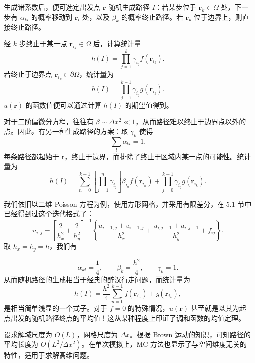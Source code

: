 生成诸系数后，便可选定出发点 $\bm r$ 随机生成路径 $I$：若某步位于 $\bm r_k\in\Omega$ 处，下一步有 $\alpha_{kl}$ 的概率移动到 $\bm r_l$ 处，以及 $\beta_k$ 的概率终止路径。若 $\bm r_k$ 位于边界上，则直接终止路径。

经 $k$ 步终止于某一点 $\bm r_{i_k}\in\Omega$ 后，计算统计量
\begin{equation}
 h(I)=\prod_{j=1}^{k}\gamma_{i_j}f(\bm r_{i_k}).
\tag{7.2.25}
\end{equation}
若终止于边界点 $\bm r_{i_k}\in\partial\Omega$，统计量为
\begin{equation}
 h(I)=\prod_{j=1}^{k-1}\gamma_{i_j}g(\bm r_{i_k}).
\tag{7.2.26}
\end{equation}
$u(\bm r)$ 的函数值便可以通过计算 $h(I)$ 的期望值得到。

对于二阶偏微分方程，往往有 $\beta\sim\Delta x^2\ll1$，从而路径难以终止于边界点以外的点。因此，有另一种生成路径的方案：取 $\gamma_k$ 使得
\begin{equation}
 \sum_l\alpha_{kl}=1.
\tag{7.2.27}
\end{equation}
每条路径都起始于 $\bm r$，终止于边界，而排除了终止于区域内某一点的可能性。统计量为
\begin{equation}
 h(I)=\sum_{n=0}^{k-1}\left[\prod_{j=1}^{n}\gamma_{i_j}\right]\beta_{i_n}f(\bm r_{i_n})
 +\prod_{j=0}^{k-1}\gamma_{i_j}g(\bm r_{i_k}).
\tag{7.2.28}
\end{equation}

我们依旧以二维 Poisson 方程为例，使用方形网格，并采用有限差分，在 5.1 节中已经得到过这个迭代格式了：
\begin{equation}
 u_{i,j}=\left[\frac{2}{h_x^2}+\frac{2}{h_y^2}\right]^{-1}
 \left\{\frac{u_{i+1,j}+u_{i-1,j}}{h_x^2}+\frac{u_{i,j+1}+u_{i,j-1}}{h_y^2}+f_{ij}\right\}.
\tag{7.2.29}
\end{equation}
取 $h_x=h_y=h$，我们有

\begin{equation}
 \alpha_{kl}=\frac14,\qquad \beta_k=\frac{h^2}{4},\qquad \gamma_k=1.
\tag{7.2.30}
\end{equation}
从而随机路径的生成相当于经典的醉汉行走问题，而统计量为
\begin{equation}
 h(I)=\frac{h^2}{4}\sum_{n=0}^{k-1}f(\bm r_{i_n})+g(\bm r_{i_k}),
\tag{7.2.31}
\end{equation}
是相当简单浅显的一个式子。对于 $f=0$ 的特殊情况，$u(\bm r)$ 甚至就是以其为起点出发的随机路径终点的平均值！这从某种程度上印证了调和函数的均值定理。

设求解域尺度为 $O(L)$，网格尺度为 $\Delta x$。根据 Brown 运动的知识，可知路径的平均长度为 $O(L^2/\Delta x^2)$。在单次模拟上，MC 方法也显示了与空间维度无关的特性，适用于求解高维问题。

